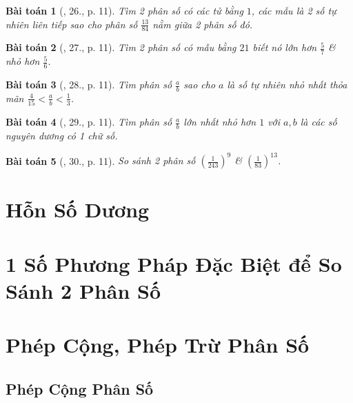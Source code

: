 \documentclass{article}
\newtheorem{baitoan}{Bài toán}
\begin{document}
\begin{baitoan}[\cite{Binh_Toan_6_tap_2}, 26., p. 11]
	Tìm 2 phân số có các tử bằng $1$, các mẫu là 2 số tự nhiên liên tiếp sao cho phân số $\frac{13}{84}$ nằm giữa 2 phân số đó.
\end{baitoan}

\begin{baitoan}[\cite{Binh_Toan_6_tap_2}, 27., p. 11]
	Tìm 2 phân số có mẫu bằng $21$ biết nó lớn hơn $\frac{5}{7}$ \& nhỏ hơn $\frac{5}{6}$.
\end{baitoan}

\begin{baitoan}[\cite{Binh_Toan_6_tap_2}, 28., p. 11]
	Tìm phân số $\frac{a}{b}$ sao cho $a$ là số tự nhiên nhỏ nhất thỏa mãn $\frac{4}{15} < \frac{a}{b} < \frac{1}{3}$.
\end{baitoan}

\begin{baitoan}[\cite{Binh_Toan_6_tap_2}, 29., p. 11]
	Tìm phân số $\frac{a}{b}$ lớn nhất nhỏ hơn $1$ với $a,b$ là các số nguyên dương có 1 chữ số.
\end{baitoan}

\begin{baitoan}[\cite{Binh_Toan_6_tap_2}, 30., p. 11]
	So sánh 2 phân số $\left(\frac{1}{243}\right)^9$ \& $\left(\frac{1}{83}\right)^{13}$.
\end{baitoan}


\section{Hỗn Số Dương}


\section{1 Số Phương Pháp Đặc Biệt để So Sánh 2 Phân Số}


\section{Phép Cộng, Phép Trừ Phân Số}

\subsection{Phép Cộng Phân Số}
\end{document}
